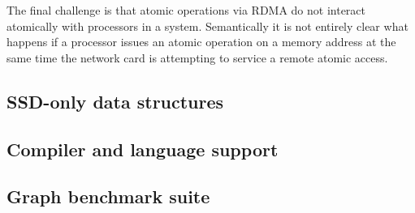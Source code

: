 The final challenge is that atomic operations via RDMA do not interact atomically with processors in a system.  Semantically it is not entirely clear what happens if a processor issues an atomic operation on a memory address at the same time the network card is attempting to service a remote atomic access. 

\subsection{SSD-only data structures}

\subsection{Compiler and language support}

\subsection{Graph benchmark suite}



